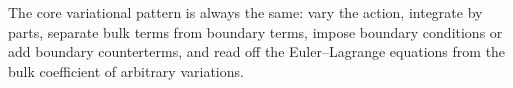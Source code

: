 \begin{summarybox}
The core variational pattern is always the same: vary the action, integrate by
parts, separate bulk terms from boundary terms, impose boundary conditions or add
boundary counterterms, and read off the Euler--Lagrange equations from the bulk
coefficient of arbitrary variations.
\end{summarybox}
